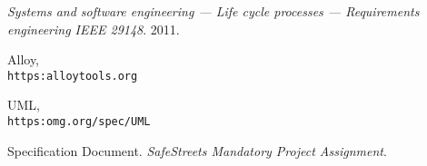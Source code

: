 




\begin{thebibliography}{9}
\textit{Systems and software engineering — Life cycle processes — Requirements engineering IEEE 29148}. 
2011.

Alloy,
\\\texttt{https:alloytools.org} 

UML,
\\\texttt{https:omg.org/spec/UML}

Specification Document. 
\textit{SafeStreets Mandatory Project Assignment}. 

\end{thebibliography}
